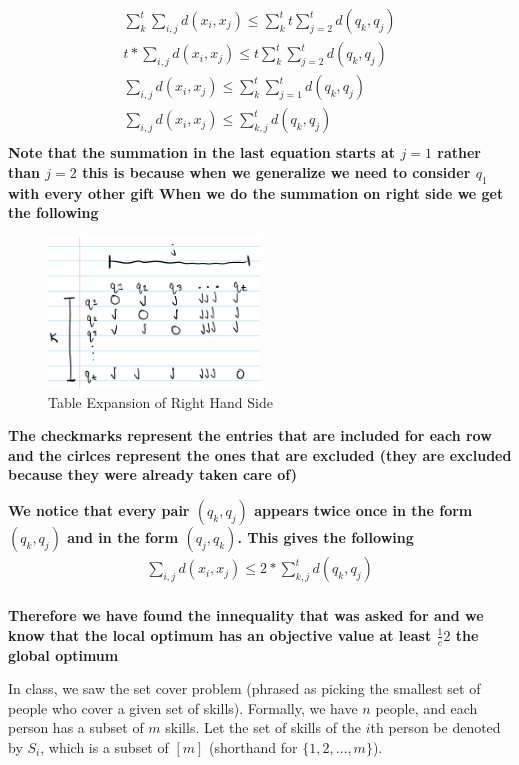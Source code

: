 \documentclass[addpoints]{exam}
\def\mysolution#1{}    %
\begin{document}
\begin{questions}
\begin{parts}
\begin{align*}
    \sum_k^t \sum_{i,j}d(x_i, x_j) \le \sum_k^t t \sum_{j=2}^{t} d(q_k,q_j) \\
    t * \sum_{i,j} d(x_i, x_j) \le t \sum_k^t \sum_{j=2}^{t} d(q_k,q_j) \\
    \sum_{i,j} d(x_i, x_j) \le \sum_k^t \sum_{j=1}^{t} d(q_k,q_j) \\
    \sum_{i,j} d(x_i, x_j) \le \sum_{k,j}^{t} d(q_k,q_j) \\
\end{align*}
\textbf{Note that the summation in the last equation starts at $j=1$ rather than $j=2$ this is because when we generalize we need to consider $q_1$ with every other gift}
\textbf{When we do the summation on right side we get the following}
 \begin{figure}[H]
 \centering
  \includegraphics[width=0.5\textwidth]{RHS expansion.png}
 \caption{Table Expansion of Right Hand Side}
 \end{figure}

\textbf{The checkmarks represent the entries that are included for each row and the cirlces represent the ones that are excluded (they are excluded because they were already taken care of)}

\textbf{We notice that every pair $(q_k,q_j)$ appears twice once in the form $(q_k,q_j)$ and in the form $(q_j, q_k)$. This gives the following}
\begin{align*}
\sum_{i,j} d(x_i, x_j) \le 2 * \sum_{k,j}^{t} d(q_k,q_j) \\
\end{align*}

\textbf{Therefore we have found the innequality that was asked for and we know that the local optimum has an objective value at least $\frac{1}c{2}$ the global optimum}
\mysolution{

}
\end{parts}
\newpage
{}
In class, we saw the set cover problem (phrased as picking the smallest set of people who cover a given set of skills). Formally, we have $n$ people, and each person has a subset of $m$ skills. Let the set of skills of the $i$th person be denoted by $S_i$, which is a subset of $[m]$ (shorthand for $\{1, 2, \dots, m\}$). 
\begin{parts}

\end{parts}
\end{questions}
\end{document}
